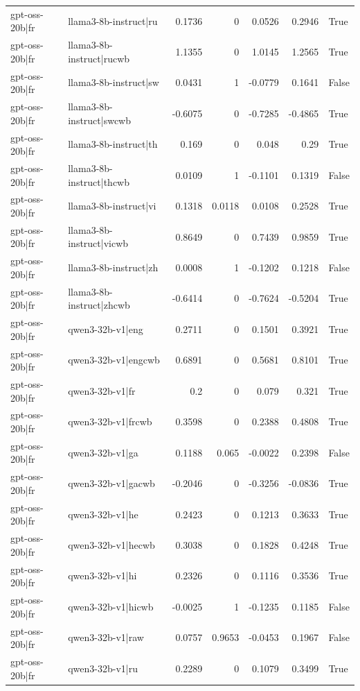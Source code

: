 \begin{table}
\begin{tabular}{l l r r r r l}
gpt-oss-20b|fr & llama3-8b-instruct|ru & 0.1736 & 0 & 0.0526 & 0.2946 & True \\
gpt-oss-20b|fr & llama3-8b-instruct|rucwb & 1.1355 & 0 & 1.0145 & 1.2565 & True \\
gpt-oss-20b|fr & llama3-8b-instruct|sw & 0.0431 & 1 & -0.0779 & 0.1641 & False \\
gpt-oss-20b|fr & llama3-8b-instruct|swcwb & -0.6075 & 0 & -0.7285 & -0.4865 & True \\
gpt-oss-20b|fr & llama3-8b-instruct|th & 0.169 & 0 & 0.048 & 0.29 & True \\
gpt-oss-20b|fr & llama3-8b-instruct|thcwb & 0.0109 & 1 & -0.1101 & 0.1319 & False \\
gpt-oss-20b|fr & llama3-8b-instruct|vi & 0.1318 & 0.0118 & 0.0108 & 0.2528 & True \\
gpt-oss-20b|fr & llama3-8b-instruct|vicwb & 0.8649 & 0 & 0.7439 & 0.9859 & True \\
gpt-oss-20b|fr & llama3-8b-instruct|zh & 0.0008 & 1 & -0.1202 & 0.1218 & False \\
gpt-oss-20b|fr & llama3-8b-instruct|zhcwb & -0.6414 & 0 & -0.7624 & -0.5204 & True \\
gpt-oss-20b|fr & qwen3-32b-v1|eng & 0.2711 & 0 & 0.1501 & 0.3921 & True \\
gpt-oss-20b|fr & qwen3-32b-v1|engcwb & 0.6891 & 0 & 0.5681 & 0.8101 & True \\
gpt-oss-20b|fr & qwen3-32b-v1|fr & 0.2 & 0 & 0.079 & 0.321 & True \\
gpt-oss-20b|fr & qwen3-32b-v1|frcwb & 0.3598 & 0 & 0.2388 & 0.4808 & True \\
gpt-oss-20b|fr & qwen3-32b-v1|ga & 0.1188 & 0.065 & -0.0022 & 0.2398 & False \\
gpt-oss-20b|fr & qwen3-32b-v1|gacwb & -0.2046 & 0 & -0.3256 & -0.0836 & True \\
gpt-oss-20b|fr & qwen3-32b-v1|he & 0.2423 & 0 & 0.1213 & 0.3633 & True \\
gpt-oss-20b|fr & qwen3-32b-v1|hecwb & 0.3038 & 0 & 0.1828 & 0.4248 & True \\
gpt-oss-20b|fr & qwen3-32b-v1|hi & 0.2326 & 0 & 0.1116 & 0.3536 & True \\
gpt-oss-20b|fr & qwen3-32b-v1|hicwb & -0.0025 & 1 & -0.1235 & 0.1185 & False \\
gpt-oss-20b|fr & qwen3-32b-v1|raw & 0.0757 & 0.9653 & -0.0453 & 0.1967 & False \\
gpt-oss-20b|fr & qwen3-32b-v1|ru & 0.2289 & 0 & 0.1079 & 0.3499 & True \\

\end{tabular}
\end{table}
